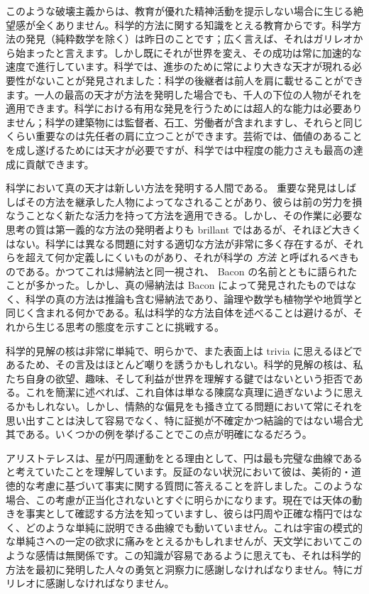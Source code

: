 \documentclass[a4paper,11pt,openany]{ltjsbook}
\begin{document}
このような破壊主義からは、教育が優れた精神活動を提示しない場合に生じる絶望感が全くありません。科学的方法に関する知識をとえる教育からです。科学方法の発見（純粋数学を除く）は昨日のことです；広く言えば、それはガリレオから始まったと言えます。しかし既にそれが世界を変え、その成功は常に加速的な速度で進行しています。科学では、進歩のために常により大きな天才が現れる必要性がないことが発見されました：科学の後継者は前人を肩に載せることができます。一人の最高の天才が方法を発明した場合でも、千人の下位の人物がそれを適用できます。科学における有用な発見を行うためには超人的な能力は必要ありません；科学の建築物には監督者、石工、労働者が含まれますし、それらと同じくらい重要なのは先任者の肩に立つことができます。芸術では、価値のあることを成し遂げるためには天才が必要ですが、科学では中程度の能力さえも最高の達成に貢献できます。

科学において真の天才は新しい方法を発明する人間である。
重要な発見はしばしばその方法を継承した人物によってなされることがあり、彼らは前の労力を損なうことなく新たな活力を持って方法を適用できる。しかし、その作業に必要な思考の質は第一義的な方法の発明者よりも brillant ではあるが、それほど大きくはない。科学には異なる問題に対する適切な方法が非常に多く存在するが、それらを超えて何か定義しにくいものがあり、それが科学の \textit{方法} と呼ばれるべきものである。かつてこれは帰納法と同一視され、 Bacon の名前とともに語られたことが多かった。しかし、真の帰納法は Bacon によって発見されたものではなく、科学の真の方法は推論も含む帰納法であり、論理や数学も植物学や地質学と同じく含まれる何かである。私は科学的な方法自体を述べることは避けるが、それから生じる思考の態度を示すことに挑戦する。

科学的見解の核は非常に単純で、明らかで、また表面上は trivia に思えるほどであるため、その言及はほとんど嘲りを誘うかもしれない。科学的見解の核は、私たち自身の欲望、趣味、そして利益が世界を理解する鍵ではないという拒否である。これを簡潔に述べれば、これ自体は単なる陳腐な真理に過ぎないように思えるかもしれない。しかし、情熱的な偏見をも掻き立てる問題において常にそれを思い出すことは決して容易でなく、特に証拠が不確定かつ結論的ではない場合尤其である。いくつかの例を挙げることでこの点が明確になるだろう。

アリストテレスは、星が円周運動をとる理由として、円は最も完璧な曲線であると考えていたことを理解しています。反証のない状況において彼は、美術的・道徳的な考慮に基づいて事実に関する質問に答えることを許しました。このような場合、この考慮が正当化されないとすぐに明らかになります。現在では天体の動きを事実として確認する方法を知っていますし、彼らは円周や正確な楕円ではなく、どのような単純に説明できる曲線でも動いていません。これは宇宙の模式的な単純さへの一定の欲求に痛みをとえるかもしれませんが、天文学においてこのような感情は無関係です。この知識が容易であるように思えても、それは科学的方法を最初に発明した人々の勇気と洞察力に感謝しなければなりません。特にガリレオに感謝しなければなりません。
\end{document}
